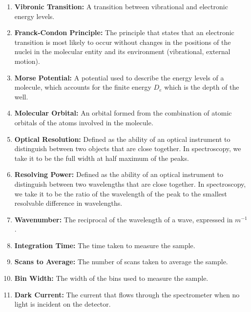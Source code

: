 \documentclass{article}
\begin{document}
\begin{enumerate}
    \item \textbf{Vibronic Transition:} A transition between vibrational and electronic energy levels.
    
    \item \textbf{Franck-Condon Principle:} The principle that states that an electronic transition is most likely to occur without changes in the positions of the nuclei in the molecular entity and its environment (vibrational, external motion)\cite{MolecularSpectroscopy}.
    
    \item \textbf{Morse Potential:} A potential used to describe the energy levels of a molecule, which accounts for the finite energy $D_e$ which is the depth of the well.
    
    \item \textbf{Molecular Orbital:} An orbital formed from the combination of atomic orbitals of the atoms involved in the molecule.
    
    \item \textbf{Optical Resolution:} Defined as the ability of an optical instrument to distinguish between two objects that are close together. In spectroscopy, we take it to be the full width at half maximum of the peaks.
    
    \item \textbf{Resolving Power:} Defined as the ability of an optical instrument to distinguish between two wavelengths that are close together. In spectroscopy, we take it to be the ratio of the wavelength of the peak to the smallest resolvable difference in wavelengths.
    
    \item \textbf{Wavenumber:} The reciprocal of the wavelength of a wave, expressed in $m^{-1}$.
    
    \item \label{kew:int_time}\textbf{Integration Time:} The time taken to measure the sample.
    
    \item \label{kew:s_t_a}\textbf{Scans to Average:} The number of scans taken to average the sample.
    
    \item \label{kew:binwidth}\textbf{Bin Width:} The width of the bins used to measure the sample.
    
    \item \label{kew: DarkCurrent}\textbf{Dark Current:} The current that flows through the spectrometer when no light is incident on the detector.
    

\end{enumerate}
\end{document}
